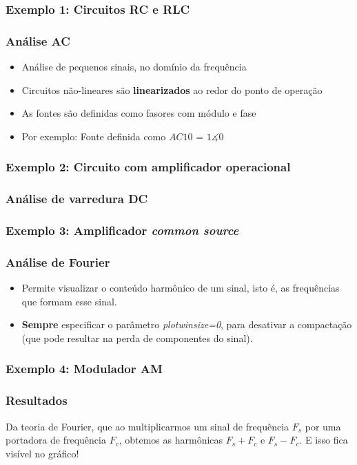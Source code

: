 \documentclass{beamer}
\begin{document}
\begin{frame}
\frametitle{Exemplo 1: Circuitos RC e RLC}
\end{frame}

\begin{frame}
\frametitle{Análise AC}
\begin{itemize}
\item{Análise de pequenos sinais, no domínio da frequência}
\item{Circuitos não-lineares são \textbf{linearizados} ao redor do ponto de operação}

\item{As fontes são definidas como fasores com módulo e fase}
\item{Por exemplo: Fonte definida como $AC 1 0$ = $1\measuredangle 0$} 
\end{itemize}
\end{frame}

\begin{frame}
\frametitle{Exemplo 2: Circuito com amplificador operacional}
\end{frame}

\begin{frame}
\frametitle{Análise de varredura DC}
\end{frame}

\begin{frame}
\frametitle{Exemplo 3: Amplificador \textit{common source}}
\end{frame}

\begin{frame}
\frametitle{Análise de Fourier}
\begin{itemize}
\item Permite visualizar o conteúdo harmônico de um sinal, isto é, as frequências que formam esse sinal.
\item \textbf{Sempre} especificar o parâmetro \textit{plotwinsize=0}, para desativar a compactação (que pode resultar na perda de componentes do sinal).
\end{itemize}
\end{frame}

\begin{frame}
\frametitle{Exemplo 4: Modulador AM}
\end{frame}

\begin{frame}
\frametitle{Resultados}
Da teoria de Fourier, que ao multiplicarmos um sinal de frequência $F_s$ por uma portadora de frequência $F_c$, obtemos as harmônicas $F_s + F_c$ e $F_s - F_c$. E isso fica visível no gráfico!

\end{frame}
\end{document}
